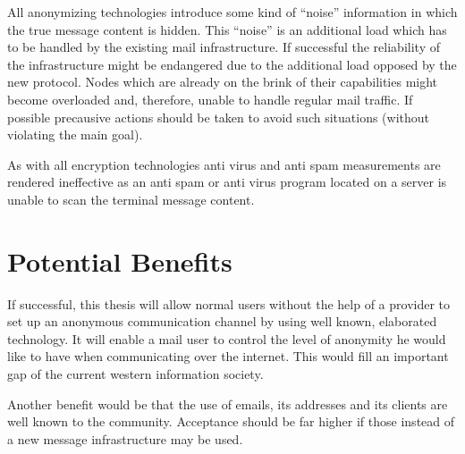 \documentclass[twocolumn,a4paper,10pt,english]{scrartcl}
\begin{document}
All anonymizing technologies introduce some kind of ``noise'' information in which the true message content is hidden. This ``noise'' is an additional load which has to be handled by the existing mail infrastructure. If successful the reliability of the infrastructure might be endangered due to the additional load opposed by the new protocol. Nodes which are already on the brink of their capabilities might become overloaded and, therefore, unable to handle regular mail traffic. If possible precausive actions should be taken to avoid such situations (without violating the main goal).\par

As with all encryption technologies anti virus and anti spam measurements are rendered ineffective as an anti spam or anti virus program located on a server is unable to scan the terminal message content.\par

\section{Potential Benefits}
If successful, this thesis will allow normal users without the help of a provider to set up an anonymous communication channel by using well known, elaborated technology. It will enable a mail user to control the level of anonymity he would like to have when communicating over the internet. This would fill an important gap of the current western information society. \par

Another benefit would be that the use of emails, its addresses and its clients are well known to the community. Acceptance should be far higher if those instead of a new message infrastructure may be used.\par
\end{document}
